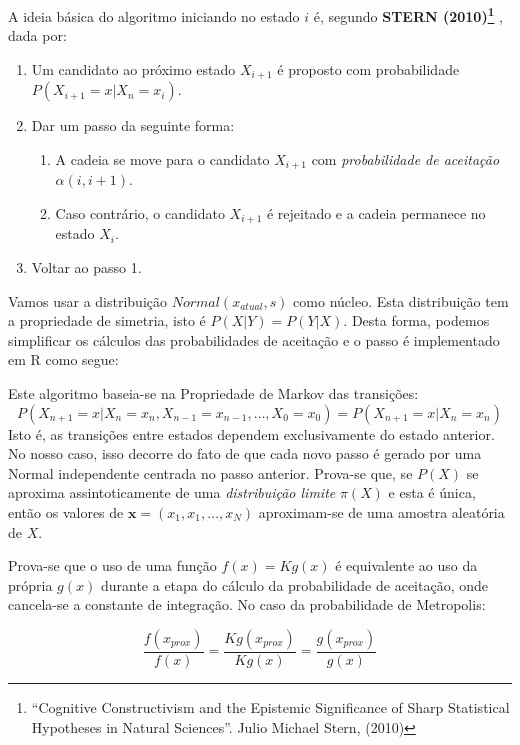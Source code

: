 \documentclass[]{article}
\providecommand{\tightlist}{%
  \setlength{\itemsep}{0pt}\setlength{\parskip}{0pt}}
\let\rmarkdownfootnote\footnote%
\def\footnote{\protect\rmarkdownfootnote}
\begin{document}
A ideia básica do algoritmo iniciando no estado \(i\) é, segundo
\textbf{STERN (2010)\footnote{``Cognitive Constructivism and the
  Epistemic Significance of Sharp Statistical Hypotheses in Natural
  Sciences''. Julio Michael Stern, (2010)} }, dada por:

\begin{enumerate}
\def\labelenumi{\arabic{enumi}.}
\tightlist
\item
  Um candidato ao próximo estado \(X_{i+1}\) é proposto com
  probabilidade \(P(X_{i+1} = x | X_n = x_i)\).
\item
  Dar um passo da seguinte forma:

  \begin{enumerate}
  \def\labelenumii{\roman{enumii})}
  \tightlist
  \item
    A cadeia se move para o candidato \(X_{i+1}\) com
    \emph{probabilidade de aceitação} \(\alpha(i,i+1)\).
  \item
    Caso contrário, o candidato \(X_{i+1}\) é rejeitado e a cadeia
    permanece no estado \(X_i\).
  \end{enumerate}
\item
  Voltar ao passo 1.
\end{enumerate}

Vamos usar a distribuição \(Normal(x_{atual},s)\) como núcleo. Esta
distribuição tem a propriedade de simetria, isto é \(P(X|Y)=P(Y|X)\).
Desta forma, podemos simplificar os cálculos das probabilidades de
aceitação e o passo é implementado em R como segue:

Este algoritmo baseia-se na Propriedade de Markov das transições:
\[P(X_{n+1} = x | X_n = x_n, X_{n-1} = x_{n-1}, \ldots, X_0 = x_0) = P(X_{n+1} = x | X_n = x_n)\]
Isto é, as transições entre estados dependem exclusivamente do estado
anterior. No nosso caso, isso decorre do fato de que cada novo passo é
gerado por uma Normal independente centrada no passo anterior. Prova-se
que, se \(P(X)\) se aproxima assintoticamente de uma \emph{distribuição
limite} \(\pi(X)\) e esta é única, então os valores de
\(\mathbf{x}=(x_1,x_1,\dots,x_N)\) aproximam-se de uma amostra aleatória
de \(X\).

Prova-se que o uso de uma função \(f(x)=Kg(x)\) é equivalente ao uso da
própria \(g(x)\) durante a etapa do cálculo da probabilidade de
aceitação, onde cancela-se a constante de integração. No caso da
probabilidade de Metropolis:

\[\frac{f(x_{prox})}{f(x)} = \frac{Kg(x_{prox})}{Kg(x)}= \frac{g(x_{prox})}{g(x)}\]
\end{document}
